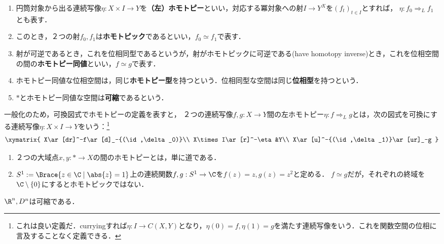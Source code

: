 \documentclass[uplatex, dvipdfmx]{jsreport}
\begin{document}
\begin{definition}\mbox{}
    \begin{enumerate}
        \item 円筒対象から出る連続写像$\eta:X\times I\to Y$を\textbf{（左）ホモトピー}といい，対応する冪対象への射$I\to Y^X$を$(f_t)_{t\in I}$とすれば，
        $\eta:f_0\Rightarrow_Lf_1$とも表す．
        \item このとき，２つの射$f_0,f_1$は\textbf{ホモトピック}であるといい，$f_0\simeq f_1$で表す．
        \item 射が可逆であるとき，これを位相同型であるというが，射がホモトピックに可逆である(have homotopy inverse)とき，これを位相空間の間の\textbf{ホモトピー同値}といい，$f\simeq g$で表す．
        \item ホモトピー同値な位相空間は，同じ\textbf{ホモトピー型}を持つという．位相同型な空間は同じ\textbf{位相型}を持つという．
        \item $*$とホモトピー同値な空間は\textbf{可縮}であるという．
    \end{enumerate}
\end{definition}
\begin{remarks}
    一般化のため，可換図式でホモトピーの定義を表すと，
    ２つの連続写像$f,g:X\to Y$間の左ホモトピー$\eta:f\Rightarrow_L g$とは，次の図式を可換にする連続写像$\eta:X\times I\to Y$をいう：\footnote{これは良い定義だ．curryingすれば$\eta:I\to C(X,Y)$となり，$\eta(0)=f,\eta(1)=g$を満たす連続写像をいう．これを関数空間の位相に言及することなく定義できる．}
        \[\xymatrix{
            X\ar[dr]^-f\ar[d]_-{(\id,\delta_0)}\\
            X\times I\ar[r]^-\eta&Y\\
            X\ar[u]^-{(\id,\delta_1)}\ar[ur]_-g
        }\]
\end{remarks}

\begin{example}\mbox{}
    \begin{enumerate}
        \item ２つの大域点$x,y:*\to X$の間のホモトピーとは，単に道である．
        \item $S^1:=\Brace{z\in\C\mid\abs{z}=1}$上の連続関数$f,g:S^1\to\C$を$f(z)=z,g(z)=z^2$と定める．
        $f\simeq g$だが，それぞれの終域を$\C\setminus\{0\}$にするとホモトピックではない．
    \end{enumerate}
\end{example}

\begin{example}[可縮な空間]
    $\R^n,D^n$は可縮である．
\end{example}
\end{document}
